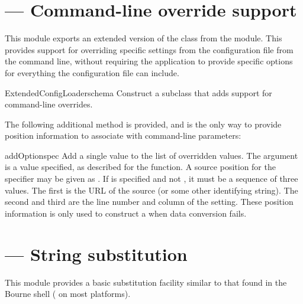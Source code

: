 \documentclass{howto}
\begin{document}
\section{ --- Command-line override support}


This module exports an extended version of the 
class from the  module.  This provides
support for overriding specific settings from the configuration file
from the command line, without requiring the application to provide
specific options for everything the configuration file can include.

\begin{classdesc}{ExtendedConfigLoader}{schema}
  Construct a  subclass that adds support for
  command-line overrides.
\end{classdesc}

The following additional method is provided, and is the only way to
provide position information to associate with command-line
parameters:

\begin{methoddesc}{addOption}{spec}
  Add a single value to the list of overridden values.  The 
  argument is a value specified, as described for the
   function.  A source
  position for the specifier may be given as .  If 
  is specified and not , it must be a sequence of three
  values.  The first is the URL of the source (or some other
  identifying string).  The second and third are the line number and
  column of the setting.  These position information is only used to
  construct a  when data conversion
  fails.
\end{methoddesc}


\section{ --- String substitution}


This module provides a basic substitution facility similar to that
found in the Bourne shell ( on most \UNIX{} platforms).  
\end{document}
